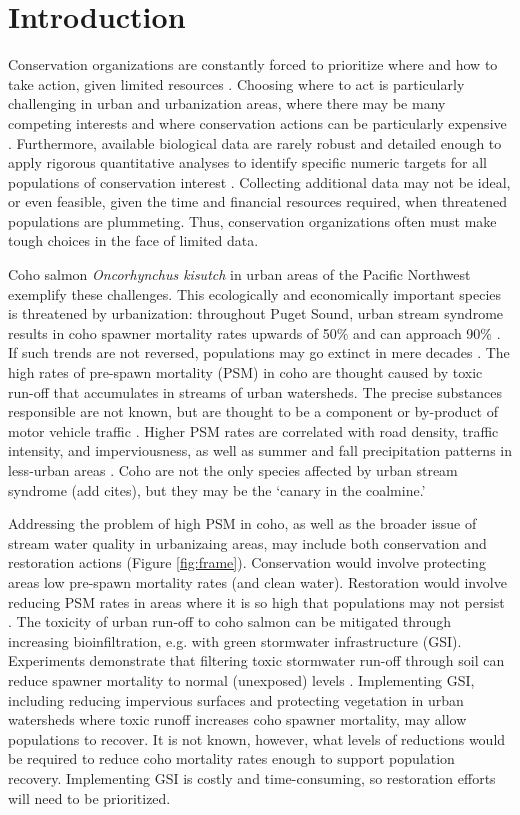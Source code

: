 \documentclass{article}
\begin{document}
\section*{Introduction}
\par Conservation organizations are constantly forced to prioritize where and how to take action, given limited resources \citep{game2013}. Choosing where to act is particularly challenging in urban and urbanization areas, where there may be many competing interests and where conservation actions can be particularly expensive \citep{moilanen2011}. Furthermore, available biological data are rarely robust and detailed enough to apply rigorous quantitative analyses to identify specific numeric targets for all populations of conservation interest \citep{cardawine2009}. Collecting additional data may not be ideal, or even feasible, given the time and financial resources required, when threatened populations are plummeting. Thus, conservation organizations often must make tough choices in the face of limited data.
\par Coho salmon \emph{Oncorhynchus kisutch} in urban areas of the Pacific Northwest exemplify these challenges. This ecologically and economically important species is threatened by urbanization: throughout Puget Sound, urban stream syndrome results in coho spawner mortality rates upwards of 50\% and can approach 90\% \citep{feist2017,spromberg2011}. If such trends are not reversed, populations may go extinct in mere decades \citep{spromberg2011}. 
The high rates of pre-spawn mortality (PSM) in coho are thought caused by toxic run-off that accumulates in streams of urban watersheds. The precise substances responsible  are not known, but are thought to be a component or by-product of motor vehicle traffic \citep{spromberg2016}. Higher PSM rates are correlated with road density, traffic intensity, and imperviousness, as well as summer and fall precipitation patterns in less-urban areas \citep{feist2017}. Coho are not the only species affected by urban stream syndrome (add cites), but they may be the `canary in the coalmine.'
\par Addressing the problem of high PSM in coho, as well as the broader issue of stream water quality in urbanizaing areas, may include both conservation and restoration actions (Figure \ref{fig:frame}). Conservation would involve protecting areas low pre-spawn mortality rates (and clean water). Restoration would involve reducing PSM rates in areas where it is so high that populations may not persist \citep{spromberg2011}. The toxicity of urban run-off to coho salmon can be mitigated through increasing bioinfiltration, e.g. with green stormwater infrastructure (GSI). Experiments demonstrate that filtering toxic stormwater run-off through soil can reduce spawner mortality to normal (unexposed) levels \cite{spromberg2016}. Implementing GSI, including reducing impervious surfaces and protecting vegetation in urban watersheds where toxic runoff increases coho spawner mortality, may allow populations to recover. It is not known, however, what levels of reductions would be required to reduce coho mortality rates enough to support population recovery. Implementing GSI is costly and time-consuming, so restoration efforts will need to be prioritized. 
\end{document}
